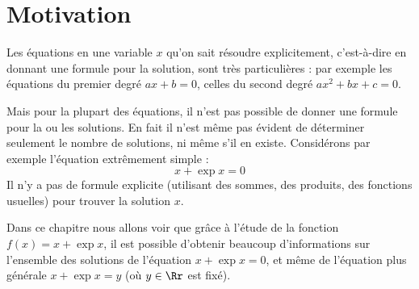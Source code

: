 \documentclass[class=report,crop=false]{standalone}
\begin{document}








\section*{Motivation}



Les équations en une variable $x$ qu'on sait résoudre explicitement, c'est-à-dire en donnant une formule pour la solution, sont très particulières : par exemple les équations du premier degré $ax+b=0$, celles du second degré $ax^2+bx+c=0$.

Mais pour la plupart des équations, il n'est pas possible de donner une formule pour la ou les solutions. En fait il n'est même pas évident de déterminer seulement le nombre de solutions, ni même s'il en existe.
Considérons par exemple l'équation extrêmement simple :
$$x + \exp x =0$$
Il n'y a pas de formule %
explicite (utilisant des sommes, des produits, des fonctions usuelles)
pour trouver la solution $x$.

Dans ce chapitre nous allons voir que grâce à l'étude de la fonction $f(x)=x + \exp x$,
il est possible d'obtenir beaucoup d'informations sur l'ensemble des solutions de l'équation $x+\exp x=0$, et même
de l'équation plus générale $x+\exp x= y$ (où $y \in \Rr$ est fixé).
\end{document}
